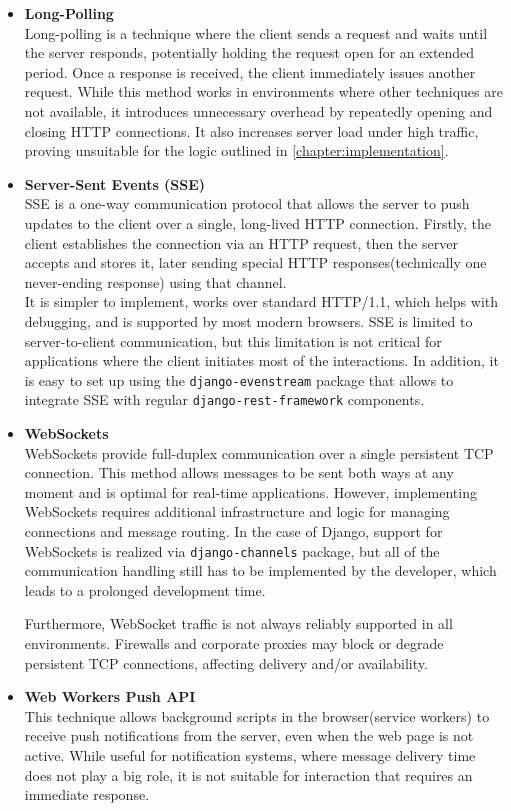 \begin{itemize}
    \item \textbf{Long-Polling} \\
    Long-polling is a technique where the client sends a request and waits until the server responds,
    potentially holding the request open for an extended period.
    Once a response is received, the client immediately issues another request.
    While this method works in environments where other techniques are not available,
    it introduces unnecessary overhead by repeatedly opening and closing HTTP connections.
    It also increases server load under high traffic, proving unsuitable for the logic outlined
    in \ref{chapter:implementation}.

    \item \textbf{Server-Sent Events (SSE)} \\
    SSE is a one-way communication protocol that allows the server to push updates to the client over a
    single, long-lived HTTP connection. Firstly, the client establishes the connection via an HTTP request, then the
    server accepts and stores it, later sending special HTTP responses(technically one never-ending response) using that channel.\\
    It is simpler to implement, works over standard HTTP/1.1, which helps with debugging,
    and is supported by most modern browsers.\cite{sse}
    SSE is limited to server-to-client communication, but this limitation is not critical for applications where the client initiates
    most of the interactions. In addition, it is easy to set up using the
    \texttt{django-evenstream}\cite{django_sse} package that allows to integrate
    SSE with regular \texttt{django-rest-framework} components.

    \item \textbf{WebSockets} \\
    WebSockets provide full-duplex communication over a single persistent TCP connection.
    This method allows messages to be sent both ways at any moment and is optimal for real-time applications\cite{websockets}.
    However, implementing WebSockets requires additional infrastructure and logic for
    managing connections and message routing. In the case of Django, support for WebSockets is realized via
    \texttt{django-channels} package, but all of the communication handling still has to be implemented by the developer,
    which leads to a prolonged development time.

    Furthermore, WebSocket traffic is not always reliably supported in all environments.
    Firewalls and corporate proxies may block or degrade persistent TCP connections,
    affecting delivery and/or availability.

    \item \textbf{Web Workers Push API} \\
    This technique allows background scripts in the browser(service workers) to receive push notifications from the server,
    even when the web page is not active.\cite{pushapi} While useful for notification systems, where message
    delivery time does not play a big role,
    it is not suitable for interaction that requires an immediate response.
\end{itemize}

